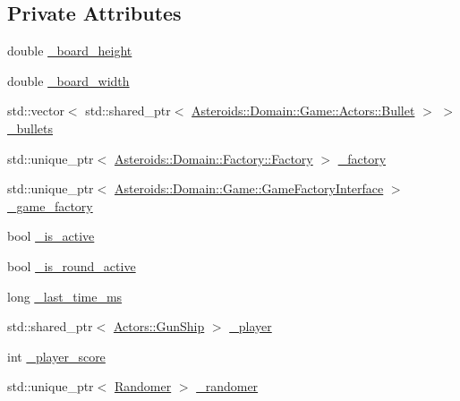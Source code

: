 \subsection*{Private Attributes}
\begin{DoxyCompactItemize}
\item 
double \hyperlink{classAsteroids_1_1Domain_1_1Game_1_1Game_a51a65c4fa072bda2baf91d50e9f6195d}{\+\_\+board\+\_\+height}
\item 
double \hyperlink{classAsteroids_1_1Domain_1_1Game_1_1Game_a6fea71dec73c6a984ac38a0abd76dd47}{\+\_\+board\+\_\+width}
\item 
std\+::vector$<$ std\+::shared\+\_\+ptr$<$ \hyperlink{classAsteroids_1_1Domain_1_1Game_1_1Actors_1_1Bullet}{Asteroids\+::\+Domain\+::\+Game\+::\+Actors\+::\+Bullet} $>$ $>$ \hyperlink{classAsteroids_1_1Domain_1_1Game_1_1Game_a9972c0063c33e27012ed2aaf8bc18ca7}{\+\_\+bullets}
\item 
std\+::unique\+\_\+ptr$<$ \hyperlink{classAsteroids_1_1Domain_1_1Factory_1_1Factory}{Asteroids\+::\+Domain\+::\+Factory\+::\+Factory} $>$ \hyperlink{classAsteroids_1_1Domain_1_1Game_1_1Game_a1085fddc231fc9b055b1c36d68a3eece}{\+\_\+factory}
\item 
std\+::unique\+\_\+ptr$<$ \hyperlink{classAsteroids_1_1Domain_1_1Game_1_1GameFactoryInterface}{Asteroids\+::\+Domain\+::\+Game\+::\+Game\+Factory\+Interface} $>$ \hyperlink{classAsteroids_1_1Domain_1_1Game_1_1Game_ae88a905921e87ce11e14fcbde3aa675a}{\+\_\+game\+\_\+factory}
\item 
bool \hyperlink{classAsteroids_1_1Domain_1_1Game_1_1Game_a82dc6bf04b526d6ed87dc11256cdf88e}{\+\_\+is\+\_\+active}
\item 
bool \hyperlink{classAsteroids_1_1Domain_1_1Game_1_1Game_a10d00a146ac392a4996b9076e970c2c4}{\+\_\+is\+\_\+round\+\_\+active}
\item 
long \hyperlink{classAsteroids_1_1Domain_1_1Game_1_1Game_a29c32f9fcd574468a810df45f0a7fe6a}{\+\_\+last\+\_\+time\+\_\+ms}
\item 
std\+::shared\+\_\+ptr$<$ \hyperlink{classAsteroids_1_1Domain_1_1Game_1_1Actors_1_1GunShip}{Actors\+::\+Gun\+Ship} $>$ \hyperlink{classAsteroids_1_1Domain_1_1Game_1_1Game_a98ff3e6110403a4133ebbae40d4eb605}{\+\_\+player}
\item 
int \hyperlink{classAsteroids_1_1Domain_1_1Game_1_1Game_ac21c7069836851c7485c39d1864df670}{\+\_\+player\+\_\+score}
\item 
std\+::unique\+\_\+ptr$<$ \hyperlink{classAsteroids_1_1Domain_1_1Game_1_1Randomer}{Randomer} $>$ \hyperlink{classAsteroids_1_1Domain_1_1Game_1_1Game_a0deb897c0ad64573f1892a769185824e}{\+\_\+randomer}

\end{DoxyCompactItemize}
